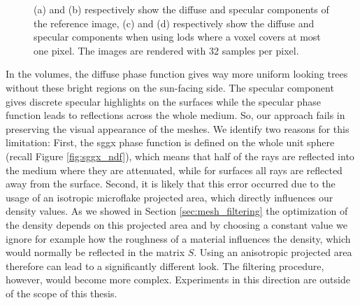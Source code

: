 \begin{figure}[t]
\begin{subfigure}[b]{0.49\linewidth}
        \caption{}
    \end{subfigure}
    \caption[Diffuse and specular components rendered separately]{(a) and (b) respectively show the diffuse and specular components of the reference image, (c) and (d) respectively show the diffuse and specular components when using \acsp{lod} where a voxel covers at most one pixel. The images are rendered with 32 samples per pixel.}
	\label{fig:diffuse_specular_breakdown}
\end{figure}
In the volumes, the diffuse phase function gives way more uniform looking trees without these bright regions on the sun-facing side.
The specular component gives discrete specular highlights on the surfaces while the specular phase function leads to reflections across the whole medium.
So, our approach fails in preserving the visual appearance of the meshes.
We identify two reasons for this limitation: First, the \ac{sggx} phase function is defined on the whole unit sphere (recall Figure \ref{fig:sggx_ndf}), which means that half of the rays are reflected into the medium where they are attenuated, while for surfaces all rays are reflected away from the surface.
Second, it is likely that this error occurred due to the usage of an isotropic microflake projected area, which directly influences our density values.
As we showed in Section \ref{sec:mesh_filtering} the optimization of the density depends on this projected area and by choosing a constant value we ignore for example how the roughness of a material influences the density, which would normally be reflected in the matrix $S$. %
Using an anisotropic projected area therefore can lead to a significantly different look.
The filtering procedure, however, would become more complex.
Experiments in this direction are outside of the scope of this thesis.


